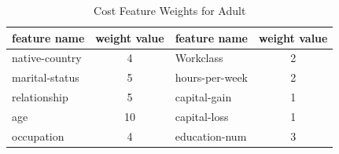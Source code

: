 \documentclass{article}
\begin{document}



\begin{table}[ht]
    \small
    \centering
    \caption{Cost Feature Weights for Adult}
    \begin{tabular}{lclc}
        \toprule
        \textbf{feature name} & \textbf{weight value} & \textbf{feature name} & \textbf{weight value}\\
        \midrule
        native-country & 4 & Workclass & 2 \\
        marital-status & 5 & hours-per-week & 2 \\
        relationship & 5 & capital-gain & 1 \\
        age & 10 & capital-loss & 1 \\
        occupation & 4 & education-num & 3 \\
        \bottomrule
    \end{tabular}
    \label{table:feature-weights-adult}
\end{table}




\end{document}
